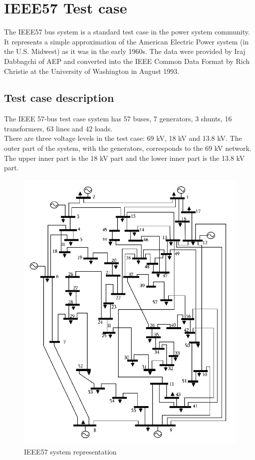 \documentclass[a4paper, 12pt]{report}
\begin{document}
\chapter{IEEE57 Test case}

The IEEE57 bus system is a standard test case in the power system community. It represents a simple approximation of the American Electric Power system (in the U.S. Midwest) as it was in the early 1960s. The data were provided by Iraj Dabbagchi of AEP and converted into the IEEE Common Data Format by Rich Christie at the University of Washington in August 1993.


\section{Test case description}

The IEEE 57-bus test case system has 57 buses, 7 generators, 3 shunts, 16 transformers, 63 lines and 42 loads.\\
There are three voltage levels in the test case: 69 kV, 18 kV and 13.8 kV. The outer part of the system, with the generators, corresponds to the 69 kV network. The upper inner part is the 18 kV part and the lower inner part is the 13.8 kV part.

\begin{figure}[H]
\includegraphics[scale=0.5]{IEEE57BusSystem.png}
\caption{IEEE57 system representation}
\label{circuit-1}
\end{figure}
\end{document}
